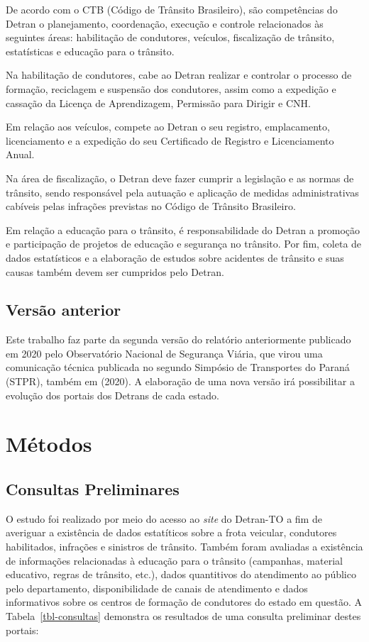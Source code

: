 \documentclass[
  a4paper,
]{article}
\begin{document}
De acordo com o CTB (Código de Trânsito Brasileiro), são competências do
Detran o planejamento, coordenação, execução e controle relacionados às
seguintes áreas: habilitação de condutores, veículos, fiscalização de
trânsito, estatísticas e educação para o trânsito.

Na habilitação de condutores, cabe ao Detran realizar e controlar o
processo de formação, reciclagem e suspensão dos condutores, assim como
a expedição e cassação da Licença de Aprendizagem, Permissão para
Dirigir e CNH.

Em relação aos veículos, compete ao Detran o seu registro, emplacamento,
licenciamento e a expedição do seu Certificado de Registro e
Licenciamento Anual.

Na área de fiscalização, o Detran deve fazer cumprir a legislação e as
normas de trânsito, sendo responsável pela autuação e aplicação de
medidas administrativas cabíveis pelas infrações previstas no Código de
Trânsito Brasileiro.

Em relação a educação para o trânsito, é responsabilidade do Detran a
promoção e participação de projetos de educação e segurança no trânsito.
Por fim, coleta de dados estatísticos e a elaboração de estudos sobre
acidentes de trânsito e suas causas também devem ser cumpridos pelo
Detran.

\subsection{Versão anterior}\label{versuxe3o-anterior}

Este trabalho faz parte da segunda versão do relatório anteriormente
publicado em 2020 pelo Observatório Nacional de Segurança Viária, que
virou uma comunicação técnica publicada no segundo Simpósio de
Transportes do Paraná (STPR), também em (2020). A elaboração de uma nova
versão irá possibilitar a evolução dos portais dos Detrans de cada
estado.

\section{Métodos}\label{sec-metodos}

\subsection{Consultas Preliminares}\label{consultas-preliminares}

O estudo foi realizado por meio do acesso ao \emph{site} do Detran-TO a
fim de averiguar a existência de dados estatíticos sobre a frota
veicular, condutores habilitados, infrações e sinistros de trânsito.
Também foram avaliadas a existência de informações relacionadas à
educação para o trânsito (campanhas, material educativo, regras de
trânsito, etc.), dados quantitivos do atendimento ao público pelo
departamento, disponibilidade de canais de atendimento e dados
informativos sobre os centros de formação de condutores do estado em
questão. A Tabela~\ref{tbl-consultas} demonstra os resultados de uma
consulta preliminar destes portais:
\end{document}
